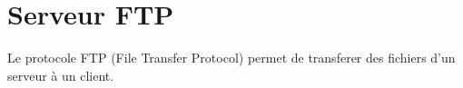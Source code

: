 \section{Serveur FTP}
Le protocole FTP (File Transfer Protocol) permet de transferer des fichiers d'un serveur à un client.


